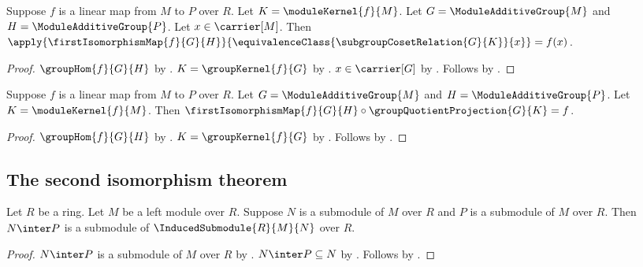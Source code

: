 \begin{proposition}\label{module_first_isomorphism_map_apply}
    Suppose $f$ is a linear map from $M$ to $P$ over $R$.
    Let $K=\moduleKernel{f}{M}$.
    Let $G=\ModuleAdditiveGroup{M}$ and
        $H=\ModuleAdditiveGroup{P}$.
    Let $x\in\carrier[M]$.
    Then
        $\apply{\firstIsomorphismMap{f}{G}{H}}{
            \equivalenceClass{\subgroupCosetRelation{G}{K}}{x}}
        =f(x)$.
\end{proposition}
\begin{proof}
    $\groupHom{f}{G}{H}$ by
        .
    $K=\groupKernel{f}{G}$ by .
    $x\in\carrier[G]$ by .
    Follows by .
\end{proof}

\begin{theorem}\label{module_first_isomorphism_factorization}
    Suppose $f$ is a linear map from $M$ to $P$ over $R$.
    Let $G=\ModuleAdditiveGroup{M}$ and
        $H=\ModuleAdditiveGroup{P}$.
    Let $K=\moduleKernel{f}{M}$.
    Then
        $\firstIsomorphismMap{f}{G}{H}\circ
            \groupQuotientProjection{G}{K}=f$.
\end{theorem}
\begin{proof}
    $\groupHom{f}{G}{H}$ by
        .
    $K=\groupKernel{f}{G}$ by .
    Follows by .
\end{proof}

\subsection{The second isomorphism theorem}

\begin{theorem}\label{module_second_isomorphism_intersection_submodule}
    Let $R$ be a ring.
    Let $M$ be a left module over $R$.
    Suppose $N$ is a submodule of $M$ over $R$ and
        $P$ is a submodule of $M$ over $R$.
    Then $N\inter P$ is a submodule of
        $\InducedSubmodule{R}{M}{N}$ over $R$.
\end{theorem}
\begin{proof}
    $N\inter P$ is a submodule of $M$ over $R$ by
        .
    $N\inter P\subseteq N$ by .
    Follows by .
\end{proof}

